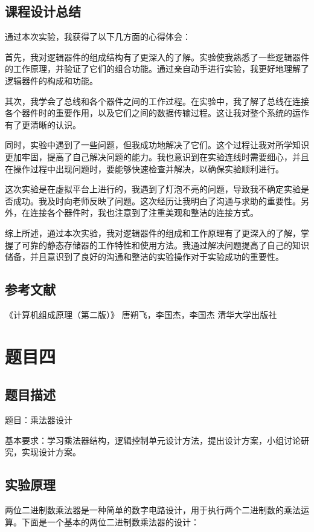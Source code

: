 \documentclass[UTF8,12pt]{article}
\begin{document}
\subsection{课程设计总结}
通过本次实验，我获得了以下几方面的心得体会：

首先，我对逻辑器件的组成结构有了更深入的了解。实验使我熟悉了一些逻辑器件的工作原理，并验证了它们的组合功能。通过亲自动手进行实验，我更好地理解了逻辑器件的构成和功能。

其次，我学会了总线和各个器件之间的工作过程。在实验中，我了解了总线在连接各个器件时的重要作用，以及它们之间的数据传输过程。这让我对整个系统的运作有了更清晰的认识。

同时，实验中遇到了一些问题，但我成功地解决了它们。这个过程让我对所学知识更加牢固，提高了自己解决问题的能力。我也意识到在实验连线时需要细心，并且在操作过程中出现问题时，要能够快速检查并解决，以确保实验顺利进行。

这次实验是在虚拟平台上进行的，我遇到了灯泡不亮的问题，导致我不确定实验是否成功。我及时向老师反映了问题。这次经历让我明白了沟通与求助的重要性。另外，在连接各个器件时，我也注意到了注重美观和整洁的连接方式。

综上所述，通过本次实验，我对逻辑器件的组成和工作原理有了更深入的了解，掌握了可靠的静态存储器的工作特性和使用方法。我通过解决问题提高了自己的知识储备，并且意识到了良好的沟通和整洁的实验操作对于实验成功的重要性。

\subsection{参考文献}
《计算机组成原理（第二版）》  唐朔飞，李国杰，李国杰   清华大学出版社

\newpage

\section{题目四}
\subsection{题目描述}
题目：乘法器设计

基本要求：学习乘法器结构，逻辑控制单元设计方法，提出设计方案，小组讨论研究，实现设计方案。

\subsection{实验原理}
两位二进制数乘法器是一种简单的数字电路设计，用于执行两个二进制数的乘法运算。下面是一个基本的两位二进制数乘法器的设计：
\end{document}
